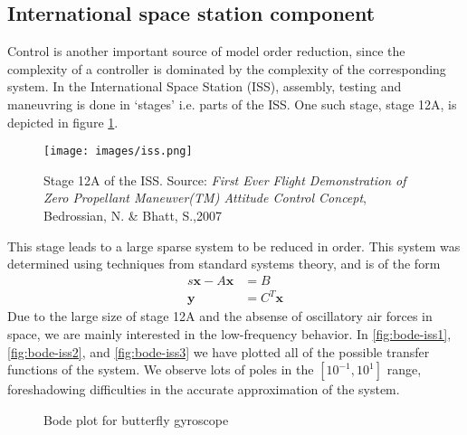 \documentclass{article}
\newlength\figurewidth
\begin{document}
	\subsection{International space station component}
	Control is another important source of model order reduction, since the complexity of a controller is dominated by the complexity of the corresponding system. In the International Space Station (ISS), assembly, testing and maneuvring is done in `stages' i.e. parts of the ISS. One such stage, stage 12A, is depicted in figure \ref{fig:stage12A}.
	\begin{figure}[h]
		\center
		\texttt{[image: images/iss.png]}\label{fig:stage12A}
		\caption{Stage 12A of the ISS. Source: \emph{First Ever Flight Demonstration of Zero Propellant Maneuver(TM) Attitude Control Concept}, Bedrossian, N. \& Bhatt, S.,2007}
	\end{figure}
	This stage leads to a large sparse system to be reduced in order. This system was determined using techniques from standard systems theory, and is of the form
	\begin{align*}
		s\mathbf{x}-A\mathbf{x}&=B\\
		\mathbf{y}&=C^T\mathbf{x}
	\end{align*}
	Due to the large size of stage 12A and the absense of oscillatory air forces in space, we are mainly interested in the low-frequency behavior.
	In \autoref{fig:bode-iss1}, \ref{fig:bode-iss2}, and \ref{fig:bode-iss3} we have plotted all of the possible transfer functions of the system. We observe lots of poles in the $\left[10^{-1}, 10^{1}\right]$ range, foreshadowing difficulties in the accurate approximation of the system.
	\begin{figure}[h!]
		\centering
		\setlength{\figurewidth}{2\textwidth}
		
		\caption{Bode plot for butterfly gyroscope}\label{fig:bode-gyro}
	\end{figure}
	
\end{document}
